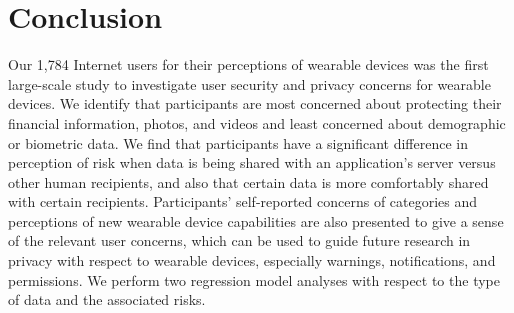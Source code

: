 
\section{Conclusion}

Our 1,784 Internet users for their perceptions of wearable devices was the first large-scale study to investigate user security and privacy concerns for wearable devices. We identify that participants are most concerned about protecting their financial information, photos, and videos and least concerned about demographic or biometric data. We find that participants have a significant difference in perception of risk when data is being shared with an application's server versus other human recipients, and also that certain data is more comfortably shared with certain recipients. Participants' self-reported concerns of categories and perceptions of new wearable device capabilities are also presented to give a sense of the relevant user concerns, which can be used to guide future research in privacy with respect to wearable devices, especially warnings, notifications, and permissions. We perform two regression model analyses with respect to the type of data and the associated risks.



